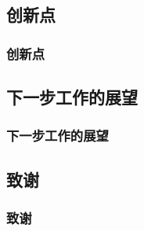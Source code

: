\documentclass[xetex,compress]{mybeamer}
\begin{document}
\subsection{创新点}
\begin{frame}
\frametitle{创新点}

\end{frame}


\subsection{下一步工作的展望}
\begin{frame}
\frametitle{下一步工作的展望}

\end{frame}


\subsection{致谢}
\begin{frame}
\frametitle{致谢}

\end{frame}
\end{document}
